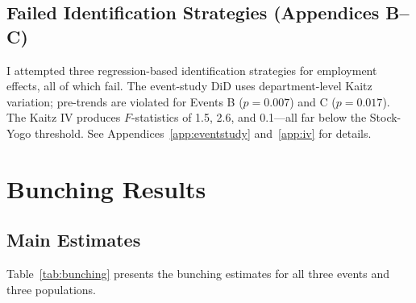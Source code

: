 \documentclass[12pt]{article}
\begin{document}
\subsection{Failed Identification Strategies (Appendices B--C)}

I attempted three regression-based identification strategies for employment effects, all of which fail. The event-study DiD uses department-level Kaitz variation; pre-trends are violated for Events B ($p = 0.007$) and C ($p = 0.017$). The Kaitz IV produces $F$-statistics of 1.5, 2.6, and 0.1---all far below the Stock-Yogo threshold. See Appendices~\ref{app:eventstudy} and~\ref{app:iv} for details.

\section{Bunching Results}\label{sec:results}

\subsection{Main Estimates}

Table~\ref{tab:bunching} presents the bunching estimates for all three events and three populations.
\end{document}
